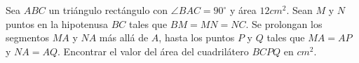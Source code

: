 Sea $ABC$ un triángulo rectángulo con $\angle BAC = 90^\circ$ y área $12cm^2$. Sean $M$ y $N$ puntos en la hipotenusa $BC$ tales que $BM = MN = NC$. Se prolongan los segmentos $MA$ y $NA$ más allá de $A$, hasta los puntos $P$ y $Q$ tales que $MA = AP$ y $NA = AQ$. Encontrar el valor del área del cuadrilátero $BCPQ$ en $cm^2$.